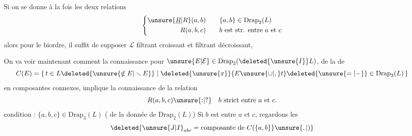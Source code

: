 Si on se donne à la fois les deux relations
\[
\left\{\begin{aligned}
\unsure{\underline R|R}(a,b)&\qquad \{a,b\}\in\mathrm{Drap}_2(L)\\
R(a,b,c)&\qquad b\text{ est str. entre }a\text{ et }c
\end{aligned}\right.
\]
alors pour  le biordre, il suffit de supposer $\mathcal L$ filtrant croissant et filtrant décroissant,  

 On va voir maintenant comment la connaissance pour $\unsure{E|\mathcal E}\in\mathrm{Drap}_2(\deleted{\unsure{I}}L)$, de la  de
\[
 C(E)=\{\,t\in L\deleted{\unsure{\notin E|\smallsetminus E}}\mid
 \deleted{\unsure{x}}\{E\unsure{\cup|,}t\}\deleted{\unsure{=|-}}\in\mathrm{Drap}_3(L)\,\}
\]
en composantes connexes, implique la connaissance de la relation
\[
 R(a,b,c)\unsure{\mathord{:}|\mathord{?}}\quad b\text{ strict entre }a\text{ et }c.
\]
 condition : $\{a,b,c\}\in\mathrm{Drap}_3(L)$ ( de la donnée de $\mathrm{Drap}_2(L)$)
Si $b$ est entre $a$ et $c$, regardons les
\[
 \deleted{\unsure{J|I}_{abc}=\text{composante de }C(\{a,b\}}\unsure{,|)}
\]

